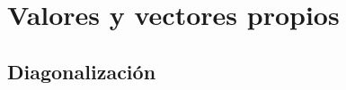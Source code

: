 \documentclass[compacto,10pt]{pubciencias-notas}
\begin{document}
\encabezado
\vspace*{-8mm}

\setcounter{section}{6}
\section{Valores y vectores propios}
\setcounter{subsection}{2}
\subsection{Diagonalización}

\end{document}
